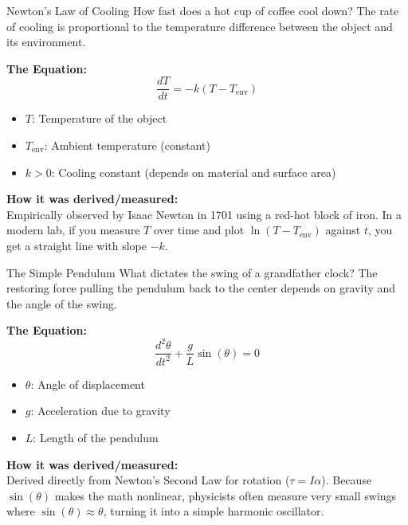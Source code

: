 \begin{frame}{Newton's Law of Cooling}
How fast does a hot cup of coffee cool down? The rate of cooling is proportional to the temperature difference between the object and its environment.

\vspace{0.5cm}
\textbf{The Equation:}
\[
\frac{dT}{dt} = -k(T - T_{\text{env}})
\]

\begin{itemize}
    \item $T$: Temperature of the object
    \item $T_{\text{env}}$: Ambient temperature (constant)
    \item $k > 0$: Cooling constant (depends on material and surface area)
\end{itemize}

\vspace{0.5cm}
\textbf{How it was derived/measured:} \\
Empirically observed by Isaac Newton in 1701 using a red-hot block of iron. In a modern lab, if you measure $T$ over time and plot $\ln(T - T_{\text{env}})$ against $t$, you get a straight line with slope $-k$.
\end{frame}


\begin{frame}{The Simple Pendulum}
What dictates the swing of a grandfather clock? The restoring force pulling the pendulum back to the center depends on gravity and the angle of the swing.

\vspace{0.5cm}
\textbf{The Equation:}
\[
\frac{d^2\theta}{dt^2} + \frac{g}{L}\sin(\theta) = 0
\]

\begin{itemize}
    \item $\theta$: Angle of displacement
    \item $g$: Acceleration due to gravity
    \item $L$: Length of the pendulum
\end{itemize}

\vspace{0.5cm}
\textbf{How it was derived/measured:} \\
Derived directly from Newton's Second Law for rotation ($\tau = I\alpha$). Because $\sin(\theta)$ makes the math nonlinear, physicists often measure very small swings where $\sin(\theta) \approx \theta$, turning it into a simple harmonic oscillator.
\end{frame}

